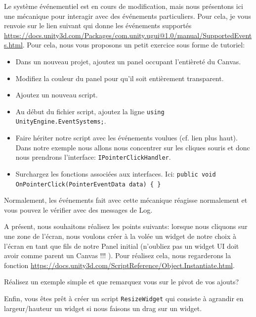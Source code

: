 \documentclass[a4paper,10pt]{article}
\begin{document}
Le système événementiel est en cours de modification, mais nous présentons ici une mécanique pour interagir avec des événements particuliers. Pour cela, je vous renvoie sur le lien suivant qui donne les événements supportés \url{https://docs.unity3d.com/Packages/com.unity.ugui@1.0/manual/SupportedEvents.html}. Pour cela, nous vous proposons un petit exercice sous forme de tutoriel:
\begin{itemize}
	\item Dans un nouveau projet, ajoutez un panel occupant l'entièreté du Canvas.
	\item Modifiez la couleur du panel pour qu'il soit entièrement transparent.
	\item Ajoutez un nouveau script.
	\item Au début du fichier script, ajoutez la ligne \lstinline|using UnityEngine.EventSystems;|.
	\item Faire hériter notre script avec les événements voulues (cf. lien plus haut). Dans notre exemple nous allons nous concentrer sur les cliques souris et donc nous prendrons l'interface: \texttt{IPointerClickHandler}.
	\item Surchargez les fonctions associées aux interfaces. Ici: \lstinline|public void OnPointerClick(PointerEventData data) { }|
\end{itemize}

Normalement, les événements fait avec cette mécanique réagisse normalement et vous pouvez le vérifier avec des messages de Log.

A présent, nous souhaitons réalisez les points suivants: lorsque nous cliquons sur une zone de l'écran, nous voulons créer à la volée un widget de notre choix à l'écran en tant que fils de notre Panel initial (n'oubliez pas un widget UI doit avoir comme parent un Canvas !!! ). Pour réalisez cela, nous regarderons la fonction \url{https://docs.unity3d.com/ScriptReference/Object.Instantiate.html}.

Réalisez un exemple simple et que remarquez vous sur le pivot de vos ajouts?

Enfin, vous êtes prêt à créer un script \texttt{ResizeWidget} qui consiste à agrandir en largeur/hauteur un widget si nous faisons un drag sur un widget.
\end{document}

